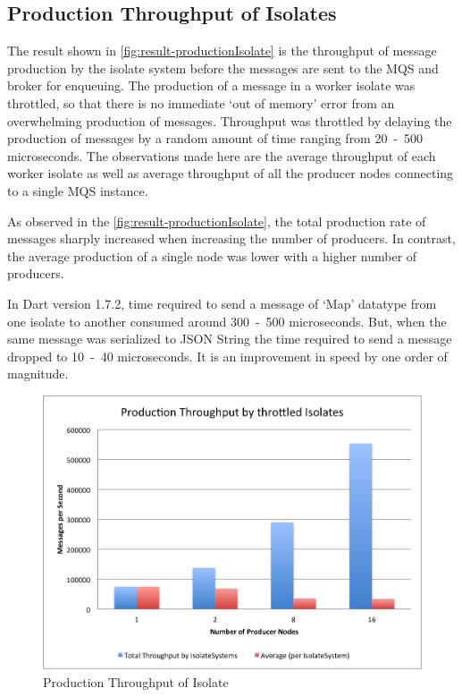 \subsection{Production Throughput of Isolates}
  The result shown in
 \autoref{fig:result-productionIsolate} is the throughput of message production by the isolate system before the messages are sent to the MQS and broker for enqueuing. The production of a message in a worker isolate was throttled, so that there is no immediate ‘out of memory’ error from an overwhelming production of messages. Throughput was throttled by delaying the production of messages by a random amount of time ranging from 20~-~500 microseconds. The observations made here are the average throughput of each worker isolate as well as average throughput of all the producer nodes connecting to a single MQS instance.

  As observed in the \autoref{fig:result-productionIsolate}, the total production rate of messages sharply increased when increasing the number of producers. In contrast, the average production of a single node was lower with a higher number of producers.

  In Dart version 1.7.2, time required to send a message of ‘Map’ datatype from one isolate to another consumed around 300~-~500 microseconds. But, when the same message was serialized to JSON String the time required to send a message dropped to 10~-~40 microseconds. It is an improvement in speed by one order of magnitude.

\begin{figure}[H]
  \centering  \includegraphics[width=1\textwidth]{figures/06productionIsolate}
  \caption[Production Throughput of Isolate]{Production Throughput of Isolate}
  \label{fig:result-productionIsolate}
\end{figure}

